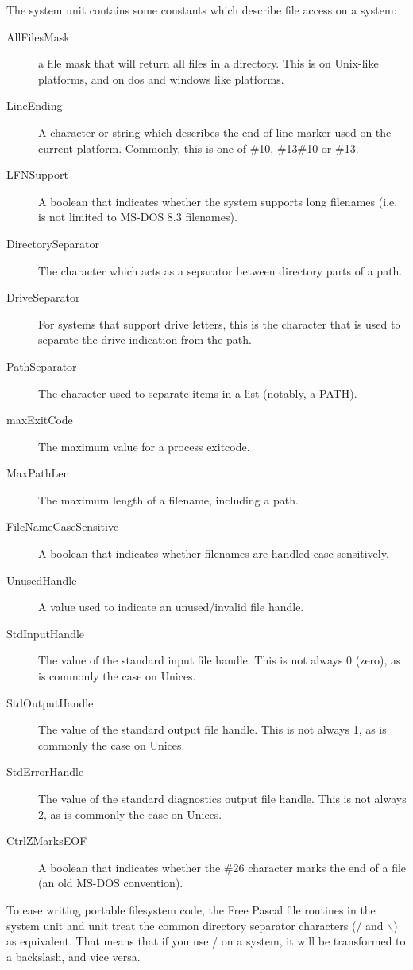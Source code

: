 The system unit contains some constants which describe file access on a system:
\begin{description}
\item[AllFilesMask] a file mask that will return all files in a directory.
This is \var{*} on Unix-like platforms, and  on dos and windows
like platforms.
\item[LineEnding] A character or string which describes the end-of-line marker 
used on the current platform. Commonly, this is one of \#10, \#13\#10 or \#13.
\item[LFNSupport] A boolean that indicates whether the system supports long filenames
(i.e. is not limited to MS-DOS 8.3 filenames).
\item[DirectorySeparator] The character which acts as a separator between directory parts of a path.
\item[DriveSeparator] For systems that support drive letters, this is the character that
is used to separate the drive indication from the path.
\item[PathSeparator] The character used to separate items in a list (notably, a PATH).
\item[maxExitCode] The maximum value for a process exitcode.
\item[MaxPathLen] The maximum length of a filename, including a path.
\item[FileNameCaseSensitive] A boolean that indicates whether filenames are handled case sensitively.
\item[UnusedHandle] A value used to indicate an unused/invalid file handle.
\item[StdInputHandle] The value of the standard input file handle. 
This is not always 0 (zero), as is commonly the case on Unices.
\item[StdOutputHandle] The value of the standard output file handle. 
This is not always 1, as is commonly the case on Unices.
\item[StdErrorHandle] The value of the standard diagnostics output file handle. 
This is not always 2, as is commonly the case on Unices.
\item[CtrlZMarksEOF] A boolean that indicates whether the \#26 character marks the end of a file
(an old MS-DOS convention).
\end{description}

To ease writing portable filesystem code, the Free Pascal file routines in
the system unit and  unit treat the common directory separator 
characters (/ and $\backslash$) as equivalent. That means that if you use / on a \windows 
system, it will be transformed to a backslash, and vice versa. 

